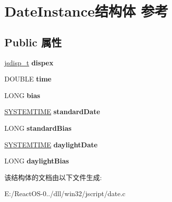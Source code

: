 \hypertarget{struct_date_instance}{}\section{Date\+Instance结构体 参考}
\label{struct_date_instance}
\subsection*{Public 属性}
\begin{DoxyCompactItemize}
\item 
\mbox{\label{struct_date_instance_a5b36037dac80428e16d0f83ad7191796}} 
\hyperlink{structjsdisp__t}{jsdisp\+\_\+t} {\bfseries dispex}
\item 
\mbox{\label{struct_date_instance_a9058ff121e3afa3e747611087b36d056}} 
D\+O\+U\+B\+LE {\bfseries time}
\item 
\mbox{\label{struct_date_instance_ac038e8e8c01aaa22877460cf738fca02}} 
L\+O\+NG {\bfseries bias}
\item 
\mbox{\label{struct_date_instance_a75ec790efab4a2cfd97534d66516d7d3}} 
\hyperlink{struct___s_y_s_t_e_m_t_i_m_e}{S\+Y\+S\+T\+E\+M\+T\+I\+ME} {\bfseries standard\+Date}
\item 
\mbox{\label{struct_date_instance_a4a8a87908e0bfc34c8a5fcc2e0bc910b}} 
L\+O\+NG {\bfseries standard\+Bias}
\item 
\mbox{\label{struct_date_instance_a5a1f35a99096b91f2158ff955a520445}} 
\hyperlink{struct___s_y_s_t_e_m_t_i_m_e}{S\+Y\+S\+T\+E\+M\+T\+I\+ME} {\bfseries daylight\+Date}
\item 
\mbox{\label{struct_date_instance_a98142ca55f2ef4dfc69dd9a794d49c7a}} 
L\+O\+NG {\bfseries daylight\+Bias}
\end{DoxyCompactItemize}


该结构体的文档由以下文件生成\+:\begin{DoxyCompactItemize}
\item 
E\+:/\+React\+O\+S-\/0../dll/win32/jscript/date.\+c\end{DoxyCompactItemize}
